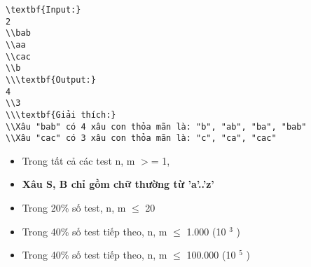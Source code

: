 \begin{verbatim}
\textbf{Input:}
2
\\bab
\\aa
\\cac
\\b
\\\textbf{Output:}
4
\\3
\\\textbf{Giải thích:}
\\Xâu "bab" có 4 xâu con thỏa mãn là: "b", "ab", "ba", "bab"
\\Xâu "cac" có 3 xâu con thỏa mãn là: "c", "ca", "cac" \end{verbatim}
\begin{itemize}
	\item     Trong tất cả các test n, m $>$= 1,   
	\item \textbf{     Xâu S, B chỉ gồm chữ thường từ 'a'..'z'    }
	\item     Trong 20\% số test, n, m  $\le$  20   
	\item     Trong 40\% số test tiếp theo, n, m  $\le$  1.000 (10    $^     3    $    )   
	\item     Trong 40\% số test tiếp theo, n, m  $\le$  100.000 (10    $^     5    $    )   
\end{itemize}